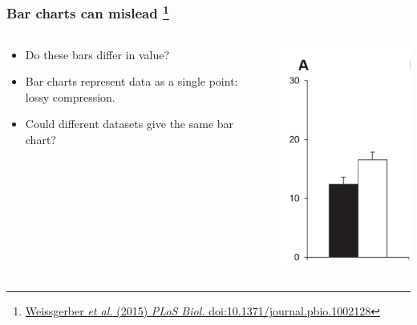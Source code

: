 \begin{frame}
  \frametitle{Bar charts can mislead
  \footnote{\tiny{\href{http://dx.doi.org/10.1371/journal.pbio.1002128}{Weissgerber \textit{et al.} (2015) \textit{PLoS Biol.} doi:10.1371/journal.pbio.1002128}}}
  }
  \begin{columns}[T]
    \begin{column}{6cm}  
      \begin{itemize}  
        \item <1->\textcolor{hutton_green}{Do these bars differ in value?}
        \item <2->\textcolor{hutton_blue}{Bar charts represent data as a single point: lossy compression.}
        \item <2->\textcolor{hutton_purple}{Could different datasets give the same bar chart?}
      \end{itemize}  
    \end{column}
    \begin{column}{4cm}  
      \includegraphics[width=1\textwidth]{images/weissgerber1}    
    \end{column}
  \end{columns}   
\end{frame}

